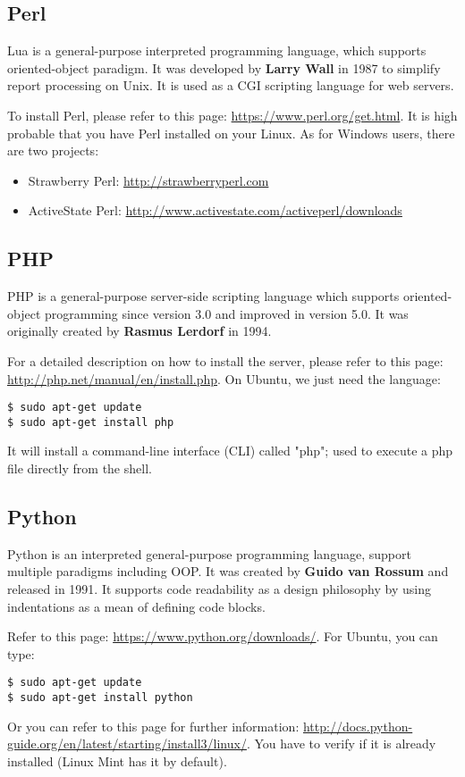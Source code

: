 \documentclass{KodeBook}
\begin{document}
\subsection{Perl}

Lua is a general-purpose interpreted programming language, which supports oriented-object paradigm. 
It was developed by \textbf{Larry Wall} in 1987 to simplify report processing on Unix.
It is used as a CGI scripting language for web servers.

To install Perl, please refer to this page: \url{https://www.perl.org/get.html}. 
It is high probable that you have Perl installed on your Linux. 
As for Windows users, there are two projects: 
\begin{itemize}
	\item Strawberry Perl: \url{http://strawberryperl.com}
	\item ActiveState Perl: \url{http://www.activestate.com/activeperl/downloads}
\end{itemize}

\subsection{PHP}

PHP is a general-purpose server-side scripting language which supports oriented-object programming since version 3.0  and improved in version 5.0.
It was originally created by \textbf{Rasmus Lerdorf} in 1994. 

For a detailed description on how to install the server, please refer to this page: \url{http://php.net/manual/en/install.php}.
On Ubuntu, we just need the language:
\begin{lstlisting}[style=shellStyle]
$ sudo apt-get update
$ sudo apt-get install php
\end{lstlisting}
It will install a command-line interface (CLI) called "php"; used to execute a php file directly from the shell.

\subsection{Python}

Python is an interpreted general-purpose programming language, support multiple paradigms including OOP. 
It was created by \textbf{Guido van Rossum} and released in 1991.
It supports code readability as a design philosophy by using indentations as a mean of defining code blocks.

Refer to this page: \url{https://www.python.org/downloads/}. 
For Ubuntu, you can type:
\begin{lstlisting}[style=shellStyle]
$ sudo apt-get update
$ sudo apt-get install python
\end{lstlisting}
Or you can refer to this page for further information: \url{http://docs.python-guide.org/en/latest/starting/install3/linux/}.
You have to verify if it is already installed (Linux Mint has it by default).
\end{document}
